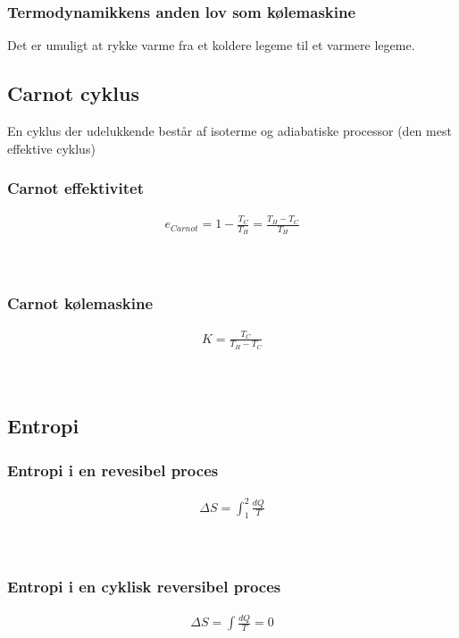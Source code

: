 	\subsubsection{Termodynamikkens anden lov som kølemaskine}
		Det er umuligt at rykke varme fra et koldere legeme til et varmere legeme.
	
\subsection{Carnot cyklus}
	En cyklus der udelukkende består af isoterme og adiabatiske processor (den mest effektive cyklus)

	\subsubsection{Carnot effektivitet}
		\begin{align}
			e_{Carnot}=1-\frac{T_C}{T_H}=\frac{T_H-T_C}{T_H}
		\end{align}
		\carnoteffekt\\
		\tempV\\
		\tempK
	
	\subsubsection{Carnot kølemaskine}
		\begin{align}
			K=\frac{T_C}{T_H-T_C}
		\end{align}
		\kolydkoef\\
		\tempK\\
		\tempV

\subsection{Entropi}
	\subsubsection{Entropi i en revesibel proces}
		\begin{align}
			\Delta S=\int_1^2\frac{dQ}{T}
		\end{align}
		\entropi\\
		\varme\\
		\tempk
	
	\subsubsection{Entropi i en cyklisk reversibel proces}
		\begin{align}
			\Delta S=\int\frac{dQ}{T}=0
		\end{align}
		\entropi\\
		\varme\\
		\tempk
	
